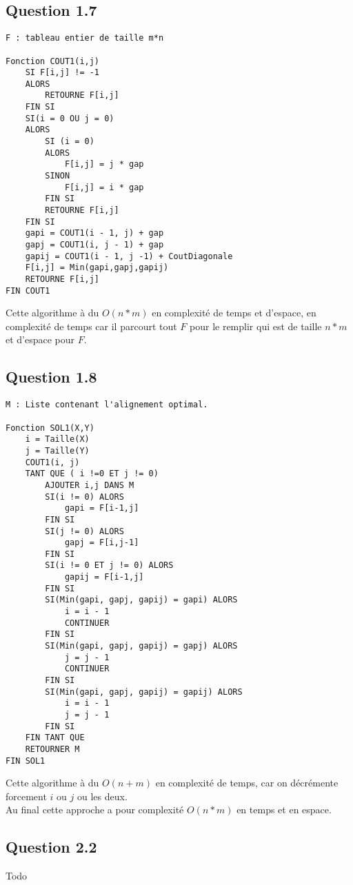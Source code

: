 \documentclass[5pt,a4paper]{report}
\begin{document}
	\subsection*{Question 1.7}
	\begin{lstlisting}
F : tableau entier de taille m*n

Fonction COUT1(i,j)
	SI F[i,j] != -1
	ALORS
		RETOURNE F[i,j]
	FIN SI
	SI(i = 0 OU j = 0)
	ALORS
		SI (i = 0)
		ALORS
			F[i,j] = j * gap
		SINON
			F[i,j] = i * gap
		FIN SI
		RETOURNE F[i,j]
	FIN SI
	gapi = COUT1(i - 1, j) + gap
	gapj = COUT1(i, j - 1) + gap
	gapij = COUT1(i - 1, j -1) + CoutDiagonale
	F[i,j] = Min(gapi,gapj,gapij)
	RETOURNE F[i,j]
FIN COUT1
	\end{lstlisting}
	Cette algorithme à du $O(n * m)$ en complexité de temps et d'espace, en complexité de 
	temps car il parcourt tout $F$ pour le remplir qui est de taille $n*m$ et d'espace pour $F$.
	
	\subsection*{Question 1.8}
	\begin{lstlisting}
M : Liste contenant l'alignement optimal.

Fonction SOL1(X,Y)
	i = Taille(X)
	j = Taille(Y)
	COUT1(i, j)
	TANT QUE ( i !=0 ET j != 0)
		AJOUTER i,j DANS M
		SI(i != 0) ALORS
			gapi = F[i-1,j]
		FIN SI
		SI(j != 0) ALORS
			gapj = F[i,j-1]
		FIN SI
		SI(i != 0 ET j != 0) ALORS
			gapij = F[i-1,j]
		FIN SI
		SI(Min(gapi, gapj, gapij) = gapi) ALORS
			i = i - 1
			CONTINUER
		FIN SI
		SI(Min(gapi, gapj, gapij) = gapj) ALORS
			j = j - 1
			CONTINUER
		FIN SI
		SI(Min(gapi, gapj, gapij) = gapij) ALORS
			i = i - 1
			j = j - 1
		FIN SI
	FIN TANT QUE
	RETOURNER M
FIN SOL1
	\end{lstlisting}
	Cette algorithme à du $O(n + m)$ en complexité de temps, car on décrémente forcement $i$ ou $j$ ou les deux.\\
	Au final cette approche a pour complexité $O(n * m)$ en temps et en espace.
	
	
	
	\subsection*{Question 2.2}
	Todo
\end{document}
